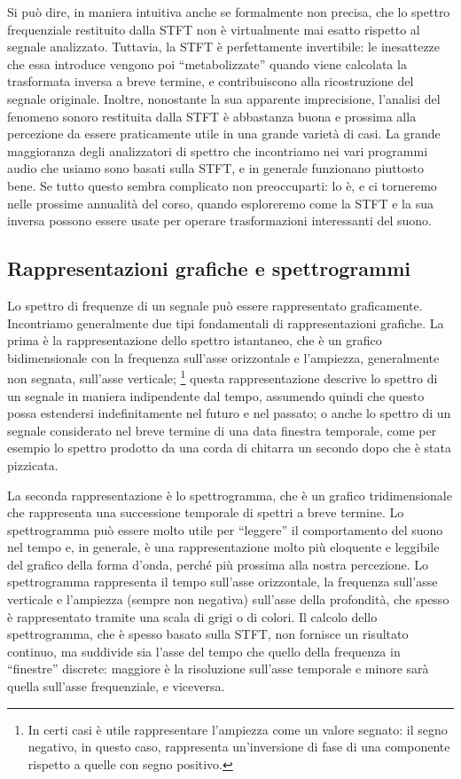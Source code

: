 Si può dire, in maniera intuitiva anche se formalmente non precisa, che lo spettro frequenziale restituito dalla STFT non è virtualmente mai esatto rispetto al segnale analizzato. Tuttavia, la STFT è perfettamente invertibile: le inesattezze che essa introduce vengono poi ``metabolizzate'' quando viene calcolata la trasformata inversa a breve termine, e contribuiscono alla ricostruzione del segnale originale. Inoltre, nonostante la sua apparente imprecisione, l'analisi del fenomeno sonoro restituita dalla STFT è abbastanza buona e prossima alla percezione da essere praticamente utile in una grande varietà di casi. La grande maggioranza degli analizzatori di spettro che incontriamo nei vari programmi audio che usiamo sono basati sulla STFT, e in generale funzionano piuttosto bene. Se tutto questo sembra complicato non preoccuparti: lo è, e ci torneremo nelle prossime annualità del corso, quando esploreremo come la STFT e la sua inversa possono essere usate per operare trasformazioni interessanti del suono.


\subsection{Rappresentazioni grafiche e spettrogrammi}

Lo spettro di frequenze di un segnale può essere rappresentato graficamente. Incontriamo generalmente due tipi fondamentali di rappresentazioni grafiche. La prima è la rappresentazione dello spettro istantaneo, che è un grafico bidimensionale con la frequenza sull'asse orizzontale e l'ampiezza, generalmente non segnata, sull'asse verticale;%
\footnote{In certi casi è utile rappresentare l'ampiezza come un valore segnato: il segno negativo, in questo caso, rappresenta un'inversione di fase di una componente rispetto a quelle con segno positivo.}
questa rappresentazione descrive lo spettro di un segnale in maniera indipendente dal tempo, assumendo quindi che questo possa estendersi indefinitamente nel futuro e nel passato; o anche lo spettro di un segnale considerato nel breve termine di una data finestra temporale, come per esempio lo spettro prodotto da una corda di chitarra un secondo dopo che è stata pizzicata.

La seconda rappresentazione è lo spettrogramma, che è un grafico tridimensionale che rappresenta una successione temporale di spettri a breve termine. Lo spettrogramma può essere molto utile per ``leggere'' il comportamento del suono nel tempo e, in generale, è una rappresentazione molto più eloquente e leggibile del grafico della forma d'onda, perché più prossima alla nostra percezione. Lo spettrogramma rappresenta il tempo sull'asse orizzontale, la frequenza sull'asse verticale e l'ampiezza (sempre non negativa) sull'asse della profondità, che spesso è rappresentato tramite una scala di grigi o di colori. Il calcolo dello spettrogramma, che è spesso basato sulla STFT, non fornisce un risultato continuo, ma suddivide sia l'asse del tempo che quello della frequenza in ``finestre'' discrete: maggiore è la risoluzione sull'asse temporale e minore sarà quella sull'asse frequenziale, e viceversa. 

